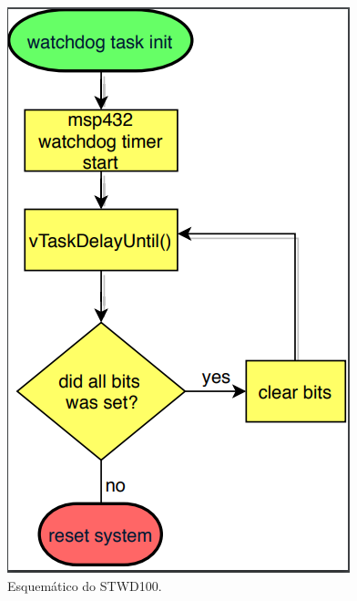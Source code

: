 \begin{apendicesenv}
\begin{figure}[!h]
	\centerfloat
	\centering
	\includegraphics[keepaspectratio=true,scale=0.5]{figuras/flowChart_wdt.PNG}
	\caption{Esquemático do STWD100.}
	\label{flowChart_wdt}
\end{figure}


\end{apendicesenv}